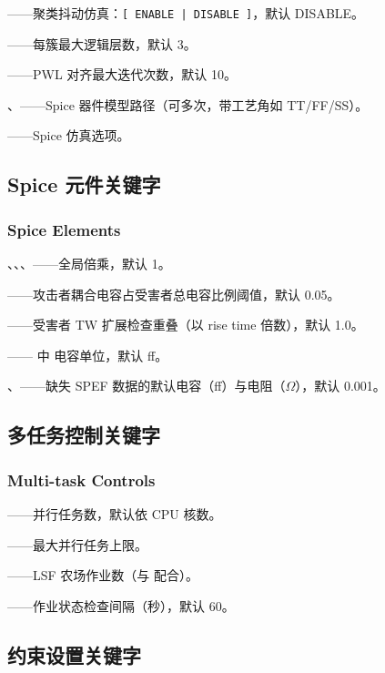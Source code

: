 ——聚类抖动仿真：\texttt{[ ENABLE | DISABLE ]}，默认 DISABLE。

——每簇最大逻辑层数，默认 3。

——PWL 对齐最大迭代次数，默认 10。

、——Spice 器件模型路径（可多次，带工艺角如 TT/FF/SS）。

——Spice 仿真选项。

\subsection{Spice 元件关键字}
\subsubsection*{Spice Elements}

、、、——全局倍乘，默认 1。

——攻击者耦合电容占受害者总电容比例阈值，默认 0.05。

——受害者 TW 扩展检查重叠（以 rise time 倍数），默认 1.0。

—— 中  电容单位，默认 ff。

、——缺失 SPEF 数据的默认电容（ff）与电阻（$\Omega$），默认 0.001。

\subsection{多任务控制关键字}
\subsubsection*{Multi-task Controls}

——并行任务数，默认依 CPU 核数。

——最大并行任务上限。

——LSF 农场作业数（与  配合）。

——作业状态检查间隔（秒），默认 60。

\subsection{约束设置关键字}
